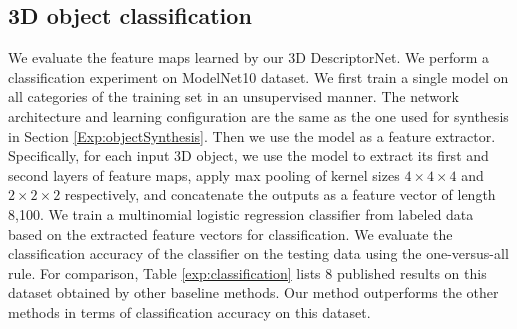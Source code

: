 \documentclass[10pt,twocolumn,letterpaper]{article}
\begin{document}
\subsection{3D object classification}

We evaluate the feature maps learned by our 3D DescriptorNet. We perform a classification experiment on ModelNet10 dataset. We first train a single model on all categories of the training set in an unsupervised manner. The network architecture and learning configuration are the same as the one used for synthesis in Section \ref{Exp:objectSynthesis}. 
Then we use the model as a feature extractor. Specifically, for each input 3D object, we use the model to extract its first and second layers of feature maps, apply max pooling of kernel sizes $4 \times 4 \times 4$ and $2 \times 2\times 2$ respectively, and concatenate the outputs as a feature vector of length 8,100. We train a multinomial logistic regression classifier from labeled data based on the extracted feature vectors for classification. We evaluate the classification accuracy of the classifier on the testing data using the one-versus-all rule. For comparison, Table \ref{exp:classification} lists 8 published results on this dataset obtained by other baseline methods. Our method outperforms the other methods in terms of classification accuracy on this dataset.
 
\end{document}

